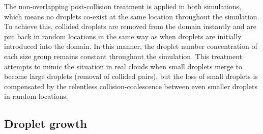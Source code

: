 The non-overlapping post-collision treatment \citep{Ayala2007} is applied in both simulations, which means no droplets co-exist at the same location throughout the simulation. To achieve this, collided droplets are removed from the domain instantly and are put back in random locations in the same way as when droplets are initially introduced into the domain. In this manner, the droplet number concentration of each size group remains constant throughout the simulation. This treatment attempts to mimic the situation in real clouds when small droplets merge to become large droplets (removal of collided pairs), but the loss of small droplets is compensated by the relentless collision-coalescence between even smaller droplets in random locations. 

\subsection{Droplet growth} \label{sec:ch3_growth}

